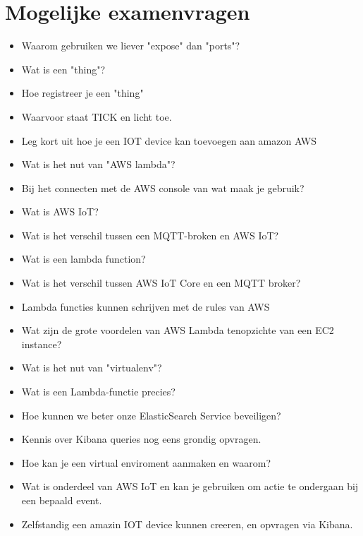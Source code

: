 \documentclass{article}
\begin{document}
\section{Mogelijke examenvragen}

\begin{itemize}
    \item Waarom gebruiken we liever "expose" dan "ports"?
    \item Wat is een "thing"? 
    \item Hoe registreer je een "thing" 
    \item Waarvoor staat TICK en licht toe.
    \item Leg kort uit hoe je een IOT device kan toevoegen aan amazon AWS 
    \item Wat is het nut van "AWS lambda"?
    \item Bij het connecten met de AWS console van wat maak je gebruik? 
    \item Wat is AWS IoT?
    \item Wat is het verschil tussen een MQTT-broken en AWS IoT?
    \item Wat is een lambda function?
    \item Wat is het verschil tussen AWS IoT Core en een MQTT broker?
    \item Lambda functies kunnen schrijven met de rules van AWS
    \item Wat zijn de grote voordelen van AWS Lambda tenopzichte van een EC2 instance?
    \item Wat is het nut van "virtualenv"?
    \item Wat is een Lambda-functie precies?
    \item Hoe kunnen we beter onze ElasticSearch Service beveiligen?
    \item Kennis over Kibana queries nog eens grondig opvragen.
    \item Hoe kan je een virtual enviroment aanmaken en waarom? 
    \item Wat is onderdeel van AWS IoT en kan je gebruiken om actie te ondergaan bij een bepaald event.
    \item Zelfstandig een amazin IOT device kunnen creeren, en opvragen via Kibana. 
\end{itemize}
\end{document}
